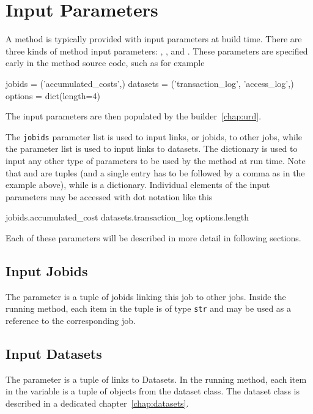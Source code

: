 \section{Input Parameters}
\label{sec:input_params}

A method is typically provided with input parameters at build time.
There are three kinds of method input parameters: \jobids, \datasets,
and \options.  These parameters are specified early in the method
source code, such as for example
\begin{python}
jobids = ('accumulated_costs',)
datasets = ('transaction_log', 'access_log',)
options = dict(length=4)
\end{python}
The input parameters are then populated by the builder~\ref{chap:urd}.

The \texttt{jobids} parameter list is used to input links, or jobids,
to other jobs, while the \datasets parameter list is used to input
links to datasets. The \options dictionary is used to input any other
type of parameters to be used by the method at run time.  Note that
\jobids and \datasets are tuples (and a single entry has to be
followed by a comma as in the example above), while \options is a
dictionary.  Individual elements of the input parameters may be
accessed with dot notation like this
\begin{python}
jobids.accumulated_cost
datasets.transaction_log
options.length
\end{python}
Each of these parameters will be described in more detail in following
sections.




\subsection*{Input Jobids}
The \jobids parameter is a tuple of jobids linking this job to other
jobs.  Inside the running method, each item in the \jobids tuple is of
type \texttt{str} and may be used as a reference to the corresponding
job.




\subsection*{Input Datasets}
The \datasets parameter is a tuple of links to Datasets.  In the
running method, each item in the \datasets variable is a tuple of
objects from the dataset class.  The dataset class is described in a
dedicated chapter~\ref{chap:datasets}.

